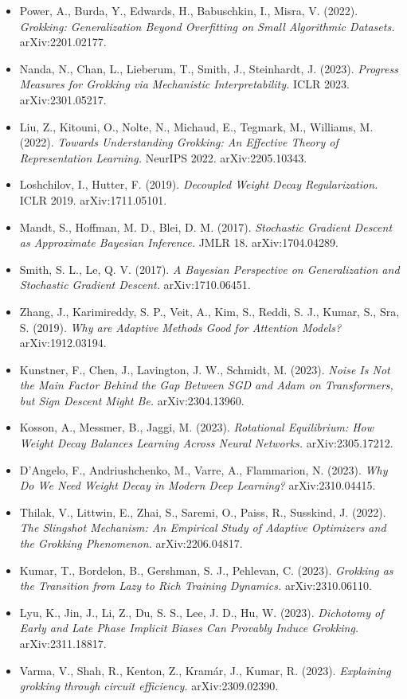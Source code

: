 \documentclass[
  11pt,
]{article}
\providecommand{\tightlist}{%
  \setlength{\itemsep}{0pt}\setlength{\parskip}{0pt}}
\begin{document}
\begin{itemize}
\tightlist
\item
  Power, A., Burda, Y., Edwards, H., Babuschkin, I., Misra, V. (2022).
  \emph{Grokking: Generalization Beyond Overfitting on Small Algorithmic
  Datasets.} arXiv:2201.02177.
\item
  Nanda, N., Chan, L., Lieberum, T., Smith, J., Steinhardt, J. (2023).
  \emph{Progress Measures for Grokking via Mechanistic
  Interpretability.} ICLR 2023. arXiv:2301.05217.
\item
  Liu, Z., Kitouni, O., Nolte, N., Michaud, E., Tegmark, M., Williams,
  M. (2022). \emph{Towards Understanding Grokking: An Effective Theory
  of Representation Learning.} NeurIPS 2022. arXiv:2205.10343.
\item
  Loshchilov, I., Hutter, F. (2019). \emph{Decoupled Weight Decay
  Regularization.} ICLR 2019. arXiv:1711.05101.
\item
  Mandt, S., Hoffman, M. D., Blei, D. M. (2017). \emph{Stochastic
  Gradient Descent as Approximate Bayesian Inference.} JMLR 18.
  arXiv:1704.04289.
\item
  Smith, S. L., Le, Q. V. (2017). \emph{A Bayesian Perspective on
  Generalization and Stochastic Gradient Descent.} arXiv:1710.06451.
\item
  Zhang, J., Karimireddy, S. P., Veit, A., Kim, S., Reddi, S. J., Kumar,
  S., Sra, S. (2019). \emph{Why are Adaptive Methods Good for Attention
  Models?} arXiv:1912.03194.
\item
  Kunstner, F., Chen, J., Lavington, J. W., Schmidt, M. (2023).
  \emph{Noise Is Not the Main Factor Behind the Gap Between SGD and Adam
  on Transformers, but Sign Descent Might Be.} arXiv:2304.13960.
\item
  Kosson, A., Messmer, B., Jaggi, M. (2023). \emph{Rotational
  Equilibrium: How Weight Decay Balances Learning Across Neural
  Networks.} arXiv:2305.17212.
\item
  D'Angelo, F., Andriushchenko, M., Varre, A., Flammarion, N. (2023).
  \emph{Why Do We Need Weight Decay in Modern Deep Learning?}
  arXiv:2310.04415.
\item
  Thilak, V., Littwin, E., Zhai, S., Saremi, O., Paiss, R., Susskind, J.
  (2022). \emph{The Slingshot Mechanism: An Empirical Study of Adaptive
  Optimizers and the Grokking Phenomenon.} arXiv:2206.04817.
\item
  Kumar, T., Bordelon, B., Gershman, S. J., Pehlevan, C. (2023).
  \emph{Grokking as the Transition from Lazy to Rich Training Dynamics.}
  arXiv:2310.06110.
\item
  Lyu, K., Jin, J., Li, Z., Du, S. S., Lee, J. D., Hu, W. (2023).
  \emph{Dichotomy of Early and Late Phase Implicit Biases Can Provably
  Induce Grokking.} arXiv:2311.18817.
\item
  Varma, V., Shah, R., Kenton, Z., Kramár, J., Kumar, R. (2023).
  \emph{Explaining grokking through circuit efficiency.}
  arXiv:2309.02390.
\end{itemize}
\end{document}
